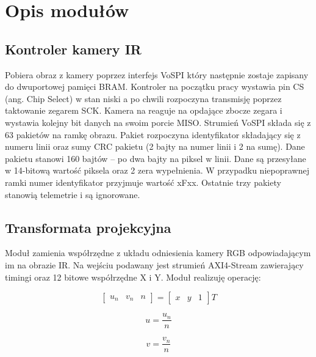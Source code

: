 \section{Opis modułów}
\subsection{Kontroler kamery IR}
Pobiera obraz z kamery poprzez interfejs VoSPI który następnie zostaje zapisany do dwuportowej pamięci BRAM. Kontroler na początku pracy wystawia pin CS (ang. Chip Select) w stan niski a po chwili rozpoczyna transmisję poprzez taktowanie zegarem SCK. Kamera na reaguje na opdające zbocze zegara i wystawia kolejny bit danych na swoim porcie MISO. Strumień VoSPI składa się z 63 pakietów na ramkę obrazu. Pakiet rozpoczyna identyfikator składający się z numeru linii oraz sumy CRC pakietu (2 bajty na numer linii i 2 na sumę). Dane pakietu stanowi 160 bajtów – po dwa bajty na piksel w linii. Dane są przesyłane w 14-bitową wartość piksela oraz 2 zera wypełnienia. W przypadku niepoprawnej ramki numer identyfikator przyjmuje wartość xFxx. Ostatnie trzy pakiety stanowią telemetrie i są ignorowane.

\subsection{Transformata projekcyjna}
Moduł zamienia współrzędne z układu odniesienia kamery RGB odpowiadającym im na obrazie IR. Na wejściu podawany jest strumień AXI4-Stream zawierający timingi oraz 12 bitowe współrzędne X i Y. Moduł realizuję operację: 

\begin{equation}
\begin{bmatrix}
u_n & v_n & n
\end{bmatrix} 
= 
\begin{bmatrix}
x & y & 1
\end{bmatrix}
T
\end{equation}

\begin{equation}
u = \frac{u_n}{n}
\end{equation}

\begin{equation}
v = \frac{v_n}{n}
\end{equation}

